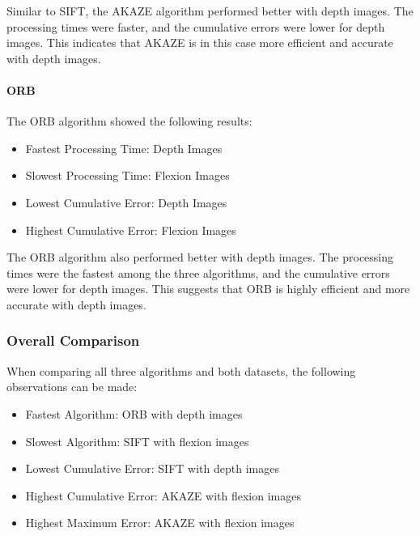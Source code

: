 \documentclass[conference, a4paper]{IEEEtran}
\begin{document}
Similar to SIFT, the AKAZE algorithm performed better with depth images. The processing times were faster, and the cumulative errors were lower for depth images. This indicates that AKAZE is in this case more efficient and accurate with depth images.

\paragraph{ORB}
The ORB algorithm showed the following results:

\begin{itemize}
	\item Fastest Processing Time: Depth Images
	\item Slowest Processing Time: Flexion Images
	\item Lowest Cumulative Error: Depth Images
	\item Highest Cumulative Error: Flexion Images
\end{itemize}

The ORB algorithm also performed better with depth images. The processing times were the fastest among the three algorithms, and the cumulative errors were lower for depth images. This suggests that ORB is highly efficient and more accurate with depth images.

\subsubsection{Overall Comparison}
When comparing all three algorithms and both datasets, the following observations can be made:

\begin{itemize}
	\item Fastest Algorithm: ORB with depth images
	\item Slowest Algorithm: SIFT with flexion images
	\item Lowest Cumulative Error: SIFT with depth images
	\item Highest Cumulative Error: AKAZE with flexion images
	\item Highest Maximum Error: AKAZE with flexion images
\end{itemize}
\end{document}
